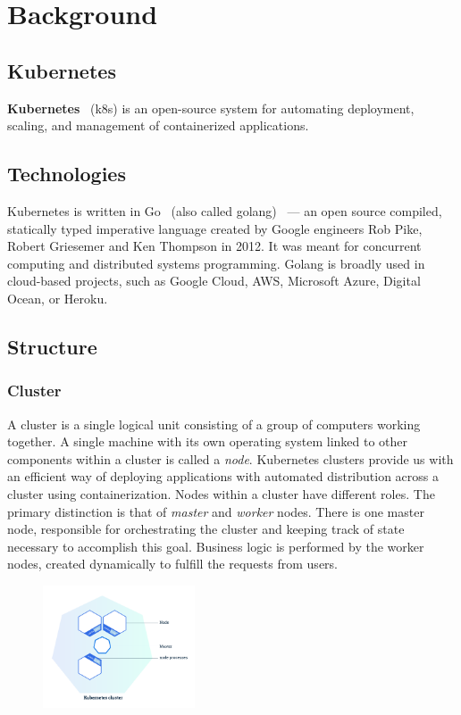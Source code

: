 \chapter{Background}

\section{Kubernetes}
\textbf{Kubernetes}~\cite{kubernetes} (k8s) is an open-source system for
automating deployment, scaling, and management of containerized applications.

\section{Technologies}
Kubernetes is written in Go~\cite{golang} (also called golang)~\cite{golang-info}
--- an open source compiled, statically typed imperative language created by
Google engineers Rob Pike, Robert Griesemer and Ken Thompson in 2012. It was
meant for concurrent computing and distributed systems programming. Golang is
broadly used in cloud-based projects, such as Google Cloud, AWS,
Microsoft Azure, Digital Ocean, or Heroku.


\section{Structure}
\subsection{Cluster}
A cluster is a single logical unit consisting of a group of computers working
together. A  single machine with its own operating system linked to other
components within a cluster is called a \emph{node}. Kubernetes clusters provide
us with an efficient way of deploying applications with automated distribution
across a cluster using containerization. Nodes within a cluster have different
roles. The primary distinction is that of \emph{master} and \emph{worker} nodes.
There is one master node, responsible for orchestrating the cluster and keeping
track of state necessary to accomplish this goal. Business logic is performed
by the worker nodes, created dynamically to fulfill the requests from users.

\begin{figure}[!ht]
    \centering
    \includegraphics[width=0.4\textwidth, angle=0]{img/kubernetes_cluster.pdf}
\end{figure}

